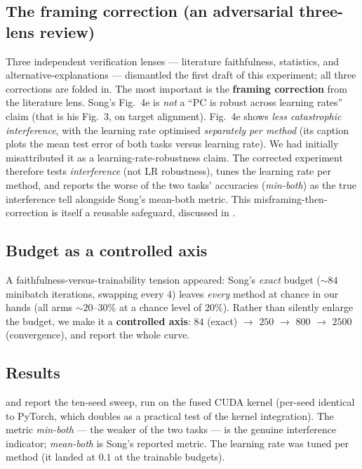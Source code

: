\subsection{The framing correction (an adversarial three-lens review)}

Three independent verification lenses --- literature faithfulness, statistics, and
alternative-explanations --- dismantled the first draft of this experiment; all three corrections
are folded in. The most important is the \textbf{framing correction} from the literature lens.
Song's Fig.~4e is \emph{not} a ``PC is robust across learning rates'' claim (that is his Fig.~3,
on target alignment). Fig.~4e shows \emph{less catastrophic interference}, with the learning rate
optimised \emph{separately per method} (its caption plots the mean test error of both tasks versus
learning rate). We had initially misattributed it as a learning-rate-robustness claim. The
corrected experiment therefore tests \emph{interference} (not LR robustness), tunes the learning
rate per method, and reports the worse of the two tasks' accuracies (\emph{min-both}) as the true
interference tell alongside Song's mean-both metric. This misframing-then-correction is itself a
reusable safeguard, discussed in .

\subsection{Budget as a controlled axis}

A faithfulness-versus-trainability tension appeared: Song's \emph{exact} budget (\(\sim\!84\)
minibatch iterations, swapping every \(4\)) leaves \emph{every} method at chance in our hands (all
arms \(\sim\!20\)--\(30\%\) at a chance level of \(20\%\)). Rather than silently enlarge the budget,
we make it a \textbf{controlled axis}: \(84\) (exact) \(\rightarrow\) \(250\) \(\rightarrow\) \(800\)
\(\rightarrow\) \(2500\) (convergence), and report the whole curve.

\subsection{Results}

 and  report the ten-seed sweep, run on the fused CUDA
kernel (per-seed identical to PyTorch, which doubles as a practical test of the kernel
integration). The metric \emph{min-both} --- the weaker of the two tasks --- is the genuine
interference indicator; \emph{mean-both} is Song's reported metric. The learning rate was tuned per
method (it landed at \(0.1\) at the trainable budgets).

